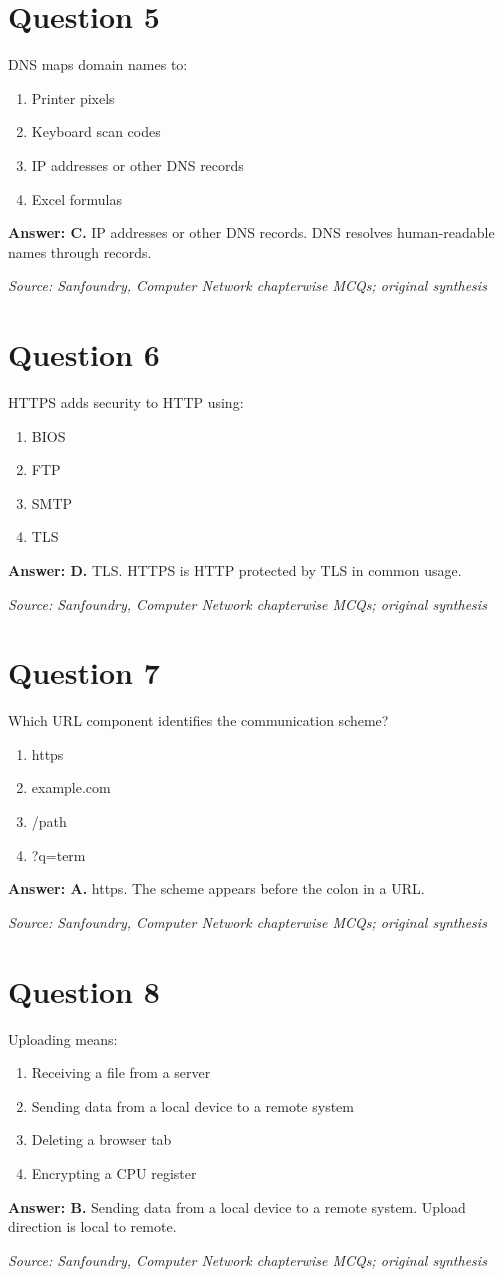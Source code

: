 \documentclass[11pt,a4paper]{book}
\newcommand{\source}[1]{\par\smallskip\textit{Source: #1}}
\newcommand{\answer}[2]{\par\textbf{Answer: #1.} #2}
\begin{document}
\section*{Question 5}
DNS maps domain names to:
\begin{enumerate}[label=\Alph*.]
\item Printer pixels
\item Keyboard scan codes
\item IP addresses or other DNS records
\item Excel formulas
\end{enumerate}
\answer{C}{IP addresses or other DNS records. DNS resolves human-readable names through records.}
\source{Sanfoundry, Computer Network chapterwise MCQs; original synthesis}
\section*{Question 6}
HTTPS adds security to HTTP using:
\begin{enumerate}[label=\Alph*.]
\item BIOS
\item FTP
\item SMTP
\item TLS
\end{enumerate}
\answer{D}{TLS. HTTPS is HTTP protected by TLS in common usage.}
\source{Sanfoundry, Computer Network chapterwise MCQs; original synthesis}
\section*{Question 7}
Which URL component identifies the communication scheme?
\begin{enumerate}[label=\Alph*.]
\item https
\item example.com
\item /path
\item ?q=term
\end{enumerate}
\answer{A}{https. The scheme appears before the colon in a URL.}
\source{Sanfoundry, Computer Network chapterwise MCQs; original synthesis}
\section*{Question 8}
Uploading means:
\begin{enumerate}[label=\Alph*.]
\item Receiving a file from a server
\item Sending data from a local device to a remote system
\item Deleting a browser tab
\item Encrypting a CPU register
\end{enumerate}
\answer{B}{Sending data from a local device to a remote system. Upload direction is local to remote.}
\source{Sanfoundry, Computer Network chapterwise MCQs; original synthesis}
\end{document}

